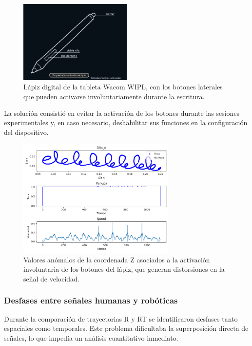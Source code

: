 \documentclass[12pt,a4paper,oneside]{report}
\begin{document}
\begin{figure}[H]
  \centering
  \includegraphics[width=0.5\textwidth]{figuras/boligrafoWacom.png}
  \caption{Lápiz digital de la tableta Wacom \acrshort{WIPL}, con los
           botones laterales que pueden activarse 
           involuntariamente durante la escritura.}
  \label{fig:boligrafoWacom}
\end{figure}

La solución consistió en evitar la activación de los botones 
durante las sesiones experimentales y, en caso necesario, 
deshabilitar sus funciones en la configuración del dispositivo.


\begin{figure}[H]
  \centering
  \includegraphics[width=0.7\textwidth]{figuras/z3.png}
  \caption{Valores anómalos de la coordenada Z asociados a la 
           activación involuntaria de los botones del lápiz, que 
           generan distorsiones en la señal de velocidad.}
  \label{fig:Z3}
\end{figure}

\subsubsection*{Desfases entre señales humanas y robóticas}
Durante la comparación de trayectorias \acrlong{R} y \acrlong{RT} 
se identificaron desfases tanto espaciales como temporales. Este 
problema dificultaba la superposición directa de señales, lo que 
impedía un análisis cuantitativo inmediato.  
\end{document}
